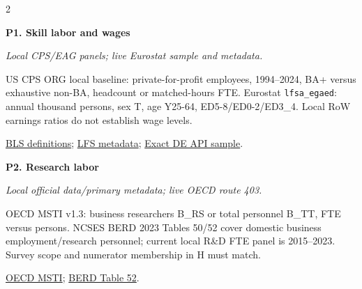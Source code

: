 \documentclass[10pt,a4paper,landscape]{article}
\newcommand{\code}[1]{{\footnotesize\texttt{#1}}}
\begin{document}
\begin{multicols}{2}
\noindent\begin{minipage}{\linewidth}\raggedright

\hypertarget{src-P1}{\textbf{P1. Skill labor and wages}}\par

{\footnotesize\itshape Local CPS/EAG panels; live Eurostat sample and metadata.}\par

US CPS ORG local baseline: private-for-profit employees, 1994--2024, BA+ versus exhaustive non-BA, headcount or matched-hours FTE. Eurostat \code{lfsa\_egaed}: annual thousand persons, sex T, age Y25-64, ED5-8/ED0-2/ED3\_4. Local RoW earnings ratios do not establish wage levels.

\par \href{https://www.bls.gov/cps/definitions.htm}{BLS definitions}; \href{https://ec.europa.eu/eurostat/cache/metadata/en/lfsa_esms.htm}{LFS metadata}; \href{https://ec.europa.eu/eurostat/api/dissemination/statistics/1.0/data/lfsa_egaed?lang=en&freq=A&unit=THS_PER&sex=T&age=Y25-64&isced11=ED5-8&geo=DE&sinceTimePeriod=2021&untilTimePeriod=2023}{Exact DE API sample}.

\end{minipage}\par\vspace{6pt}

\noindent\begin{minipage}{\linewidth}\raggedright

\hypertarget{src-P2}{\textbf{P2. Research labor}}\par

{\footnotesize\itshape Local official data/primary metadata; live OECD route 403.}\par

OECD MSTI v1.3: business researchers B\_RS or total personnel B\_TT, FTE versus persons. NCSES BERD 2023 Tables 50/52 cover domestic business employment/research personnel; current local R\&D FTE panel is 2015--2023. Survey scope and numerator membership in H must match.

\par \href{https://www.oecd.org/en/data/datasets/main-science-and-technology-indicators.html}{OECD MSTI}; \href{https://ncses.nsf.gov/pubs/nsf25354/assets/data-tables/tables/nsf25354-tab052.pdf}{BERD Table 52}.

\end{minipage}\par\vspace{6pt}


\end{multicols}
\end{document}
